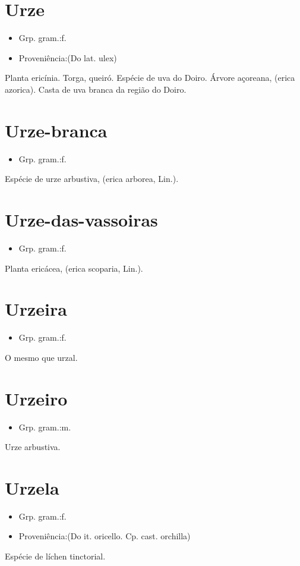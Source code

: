 \documentclass{article}
\begin{document}
\section{Urze}
\begin{itemize}
\item {Grp. gram.:f.}
\end{itemize}
\begin{itemize}
\item {Proveniência:(Do lat. \textunderscore ulex\textunderscore )}
\end{itemize}
Planta ericínia.
Torga, queiró.
Espécie de uva do Doiro.
Árvore açoreana, (\textunderscore erica azorica\textunderscore ).
Casta de uva branca da região do Doiro.
\section{Urze-branca}
\begin{itemize}
\item {Grp. gram.:f.}
\end{itemize}
Espécie de urze arbustiva, (\textunderscore erica arborea\textunderscore , Lin.).
\section{Urze-das-vassoiras}
\begin{itemize}
\item {Grp. gram.:f.}
\end{itemize}
Planta ericácea, (\textunderscore erica scoparia\textunderscore , Lin.).
\section{Urzeira}
\begin{itemize}
\item {Grp. gram.:f.}
\end{itemize}
O mesmo que \textunderscore urzal\textunderscore .
\section{Urzeiro}
\begin{itemize}
\item {Grp. gram.:m.}
\end{itemize}
Urze arbustiva.
\section{Urzela}
\begin{itemize}
\item {Grp. gram.:f.}
\end{itemize}
\begin{itemize}
\item {Proveniência:(Do it. \textunderscore oricello\textunderscore . Cp. cast. \textunderscore orchilla\textunderscore )}
\end{itemize}
Espécie de líchen tinctorial.
\end{document}
